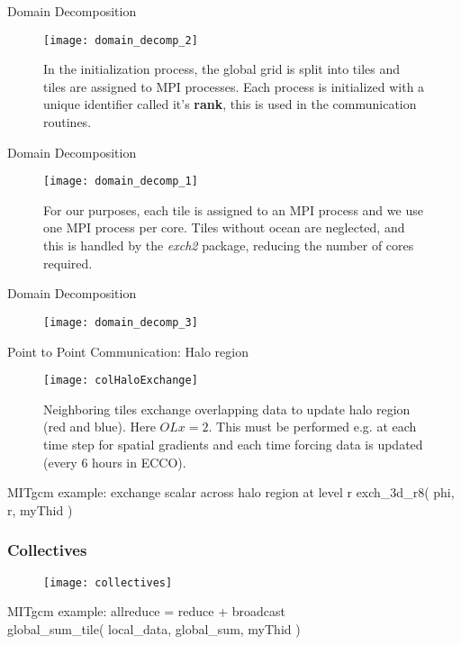 \documentclass[pdf]{beamer}
\begin{document}
 \begin{frame}{Domain Decomposition}
	\begin{figure}
	\centering
	\texttt{[image: domain\_decomp\_2]}
	\caption{In the initialization process, the global grid is split into tiles and tiles are assigned to MPI processes. Each process is initialized with a unique identifier called it's \textbf{rank}, this is used in the communication routines.} 
	\end{figure}

 \end{frame}

 \begin{frame}{Domain Decomposition}
	\begin{figure}
	\centering
	\texttt{[image: domain\_decomp\_1]}
	\caption{For our purposes, each tile is assigned to an MPI process and we use one MPI process per core. Tiles without ocean are neglected, and this is handled by the \textit{exch2} package, reducing the number of cores required.}
	\end{figure}
 \end{frame}

 \begin{frame}{Domain Decomposition}
	\begin{figure}
	\centering
	\texttt{[image: domain\_decomp\_3]}
	\end{figure}
 \end{frame}

 \begin{frame}{Point to Point Communication: Halo region}
	\begin{figure}
	\centering
	\texttt{[image: colHaloExchange]}
	\caption{Neighboring tiles exchange overlapping data to update halo region (red and blue). Here $OLx=2$. This must be performed e.g. at each time step for spatial gradients and each time forcing data is updated (every 6 hours in ECCO).}
	\end{figure}
	MITgcm example: exchange scalar across halo region at level r
	exch\_3d\_r8( phi, r, myThid )
 \end{frame}

 \begin{frame}[fragile]
 \frametitle{Collectives}
	\begin{figure}
	\centering
	\texttt{[image: collectives]}
	\end{figure}
	MITgcm example: allreduce = reduce + broadcast \\
	global\_sum\_tile( local\_data, global\_sum, myThid )
\end{frame}
\end{document}
